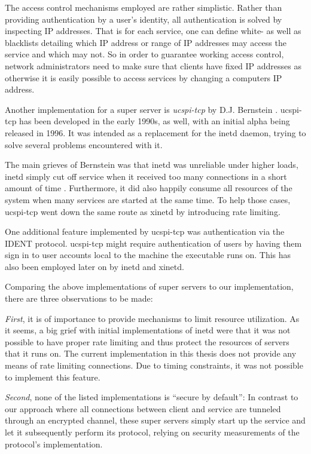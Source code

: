 The access control mechanisms employed are rather simplistic.
Rather than providing authentication by a user's identity, all authentication is solved by inspecting IP addresses.
That is for each service, one can define white- as well as blacklists detailing which IP address or range of IP addresses may access the service and which may not.
So in order to guarantee working access control, network administrators need to make sure that clients have fixed IP addresses as otherwise it is easily possible to access services by changing a computers IP address.

Another implementation for a super server is \emph{ucspi-tcp} by D.J. Bernstein \cite{ucspi-tcp}.
ucspi-tcp has been developed in the early 1990s, as well, with an initial alpha being released in 1996.
It was intended as a replacement for the inetd daemon, trying to solve several problems encountered with it.

The main grieves of Bernstein was that inetd was unreliable under higher loads, inetd simply cut off service when it received too many connections in a short amount of time \cite{ucspi-tcp}.
Furthermore, it did also happily consume all resources of the system when many services are started at the same time.
To help those cases, ucspi-tcp went down the same route as xinetd by introducing rate limiting.

One additional feature implemented by ucspi-tcp was authentication via the IDENT protocol.
ucspi-tcp might require authentication of users by having them sign in to user accounts local to the machine the executable runs on.
This has also been employed later on by inetd and xinetd.

\bigskip

Comparing the above implementations of super servers to our implementation, there are three observations to be made:

\emph{First}, it is of importance to provide mechanisms to limit resource utilization.
As it seems, a big grief with initial implementations of inetd were that it was not possible to have proper rate limiting and thus protect the resources of servers that it runs on.
The current implementation in this thesis does not provide any means of rate limiting connections.
Due to timing constraints, it was not possible to implement this feature.

\emph{Second}, none of the listed implementations is ``secure by default'':
In contrast to our approach where all connections between client and service are tunneled through an encrypted channel, these super servers simply start up the service and let it subsequently perform its protocol, relying on security measurements of the protocol's implementation.

